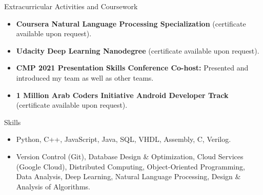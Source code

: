\documentclass[]{mcdowellcv}
\begin{document}
	\begin{cvsection}{Extracurricular Activities and Coursework}
		\begin{cvsubsection}{}{}{}
			\begin{itemize}
				\item \textbf{Coursera Natural Language Processing Specialization} (certificate available upon request).
				\item \textbf{Udacity Deep Learning Nanodegree} (certificate available upon request).
				\item \textbf{CMP 2021 Presentation Skills Conference Co-host:} Presented and introduced my team as well as other teams.
				\item \textbf{1 Million Arab Coders Initiative Android Developer Track} (certificate available upon request).
			\end{itemize}
		\end{cvsubsection}
	\end{cvsection}
	
	\begin{cvsection}{Skills}
		\begin{cvsubsection}{}{}{}
			\begin{itemize}
				\item Python, C++, JavaScript, Java, SQL, VHDL, Assembly, C, Verilog.
				\item Version Control (Git), Database Design \& Optimization, Cloud Services (Google Cloud), Distributed Computing, Object-Oriented Programming, Data Analysis, Deep Learning, Natural Language Processing, Design \& Analysis of Algorithms.
			\end{itemize}
		\end{cvsubsection}
	\end{cvsection}
	
\end{document}
